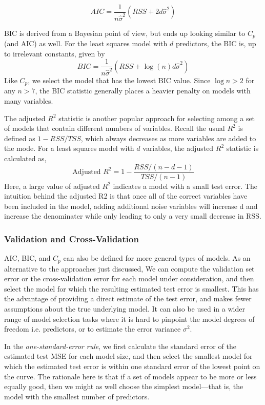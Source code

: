 \documentclass{article}
\numberwithin{equation}{section}
\begin{document}
\begin{enumerate}
\begin{equation}
    AIC = \frac{1}{n\hat\sigma^2} (RSS + 2d\hat\sigma^2)
\end{equation}

BIC is derived from a Bayesian point of view, but ends up looking similar
to $C_p$ (and AIC) as well. For the least squares model with $d$ predictors, the
BIC is, up to irrelevant constants, given by
\begin{equation}
    BIC = \frac{1}{n \hat\sigma^2} (RSS  + \log(n)d\hat\sigma^2)
\end{equation}
Like $C_p$, we select the model that has the lowest BIC value.  Since $\log n > 2$ for any $n > 7$, the BIC statistic generally places a heavier penalty on models with many variables.

The adjusted $R^2$ statistic is another popular approach for selecting among a set of models that contain different numbers of variables. Recall the usual $R^2$ is defined as $1 - RSS/TSS$, which always decreases as more variables are added to the mode. For a least squares model with $d$ variables, the adjusted $R^2$ statistic is calculated as,
\begin{equation}
\text{Adjusted }R^2 = 1 - \frac{RSS/(n-d-1)}{TSS/(n-1)}
\end{equation}
Here, a large value of adjusted $R^2$ indicates a model with a small test error. The intuition behind the adjusted R2 is that once all of the correct variables have been included in the model, adding additional noise variables will increase d and increase the denominater while only leading to only a very small decrease in RSS.

\subsubsection*{Validation and Cross-Validation}
AIC, BIC, and $C_p$  can also be defined for more general types of models. As an alternative to the approaches just discussed, We can compute the validation set error or the cross-validation error for each model under consideration, and then select the model for which the resulting estimated test error is smallest. This has the advantage of providing a direct estimate of the test error, and makes fewer assumptions about the true underlying model. It can also be used in a wider range of model selection tasks where it is hard to pinpoint the model
degrees of freedom i.e. predictors, or to estimate the error variance $\sigma^2$. 

In the \textit{one-standard-error rule}, we first calculate the standard error of the estimated test MSE for each model size, and then select the smallest model for which the estimated test error is within one standard error of the lowest point on the curve. The rationale here is that if a set of models appear to be more or less equally good, then we might as well choose the simplest model—that is, the model with the smallest number of predictors.


\end{enumerate}
\end{document}

